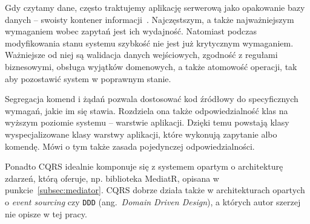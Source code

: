 Gdy czytamy dane, często traktujemy aplikację serwerową jako opakowanie bazy danych -- swoisty kontener informacji~\cite{cqrs-fowler}. Najczęstszym, a także najważniejszym wymaganiem wobec zapytań jest ich wydajność. Natomiast podczas modyfikowania stanu systemu szybkość nie jest już krytycznym wymaganiem. Ważniejsze od niej są walidacja danych wejściowych, zgodność z regułami biznesowymi, obsługa wyjątków domenowych, a także atomowość operacji, tak aby pozostawić system w poprawnym stanie.

Segregacja komend i żądań pozwala dostosować kod źródłowy do specyficznych wymagań, jakie im się stawia. Rozdziela ona także odpowiedzialność klas na wyższym poziomie systemu -- warstwie aplikacji. Dzięki temu powstają klasy wyspecjalizowane klasy warstwy aplikacji, które wykonują zapytanie albo komendę. Mówi o tym także zasada pojedynczej odpowiedzialności.

Ponadto CQRS idealnie komponuje się z systemem opartym o architekturę zdarzeń, którą oferuje, np. biblioteka MediatR, opisana w punkcie~\ref{subsec:mediator}. CQRS dobrze działa także w architekturach opartych o \emph{event sourcing} czy \texttt{DDD} (ang.~\emph{Domain Driven Design}), a których autor szerzej nie opisze w tej pracy.